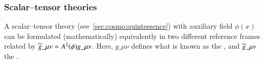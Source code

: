         

            
        
        
    \subsubsection{Scalar--tensor theories}
        A scalar--tensor theory (see~\cref{sec:cosmo:quintessence}) with auxiliary field $\phi(x)$ can be formulated (mathematically) equivalently in two different reference frames related by $\widetilde{g}\_{\mu\nu}= A^2(\phi) g\_{\mu\nu}$. Here, $g\_{\mu\nu}$ defines what is known as the , and $\widetilde{g}\_{\mu\nu}$ the . 






        
        


